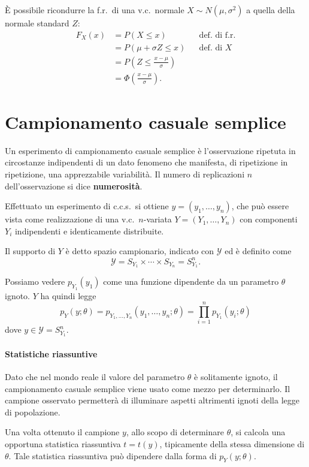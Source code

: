 \documentclass[11pt,a4paper,twoside]{article}
\let\leq\leqslant%
\newcommand\y{\mathcal{Y}}
\begin{document}
È possibile ricondurre la f.r.\ di una v.c.\ normale
\(X \sim N(\mu, \sigma^2)\) a quella della normale standard \(Z\):
\begin{align*}
  F_X(x) &= P(X \leq x) &&\mbox{def. di f.r.} \\
         &= P(\mu + \sigma Z \leq x) &&\mbox{def. di } X \\
         &= P\left( Z \leq \frac{x-\mu}{\sigma} \right) &&\\
         &= \Phi\left( \frac{x-\mu}{\sigma} \right) .
\end{align*}

\section{Campionamento casuale semplice}

Un esperimento di campionamento casuale semplice è l'osservazione
ripetuta in circostanze indipendenti di un dato fenomeno che
manifesta, di ripetizione in ripetizione, una apprezzabile
variabilità.  Il numero di replicazioni \(n\) dell'osservazione si
dice \textbf{numerosità}.

Effettuato un esperimento di c.c.s.\ si ottiene \(y = (y_1, \dots,
y_n)\), che può essere vista come realizzazione di una v.c.\
\(n\)-variata \(Y = (Y_1, \dots, Y_n)\) con componenti \(Y_i\)
indipendenti e identicamente distribuite.

Il supporto di \(Y\) è detto spazio campionario, indicato con \(\y\)
ed è definito come
\[
  \y = S_{Y_1} \times\cdots\times S_{Y_n} = S_{Y_1}^n .
\]

Possiamo vedere \(p_{Y_1}(y_1)\) come una funzione dipendente da un
parametro \(\theta\) ignoto. \(Y\) ha quindi legge
\[
  p_Y(y; \theta)
  = p_{Y_1, \dots, Y_n}(y_1, \dots, y_n; \theta)
  = \prod_{i=1}^n p_{Y_1}(y_i; \theta)
\]
dove \(y\in\y = S_{Y_1}^n\).

\paragraph{Statistiche riassuntive} Dato che nel mondo reale il valore
del parametro \(\theta\) è solitamente ignoto, il campionamento
casuale semplice viene usato come mezzo per determinarlo.  Il campione
osservato permetterà di illuminare aspetti altrimenti ignoti della
legge di popolazione.

Una volta ottenuto il campione \(y\), allo scopo di determinare
\(\theta\), si calcola una opportuna statistica riassuntiva
\(t = t(y)\), tipicamente della stessa dimensione di \(\theta\).  Tale
statistica riassuntiva può dipendere dalla forma di
\(p_Y(y; \theta)\).
\end{document}
